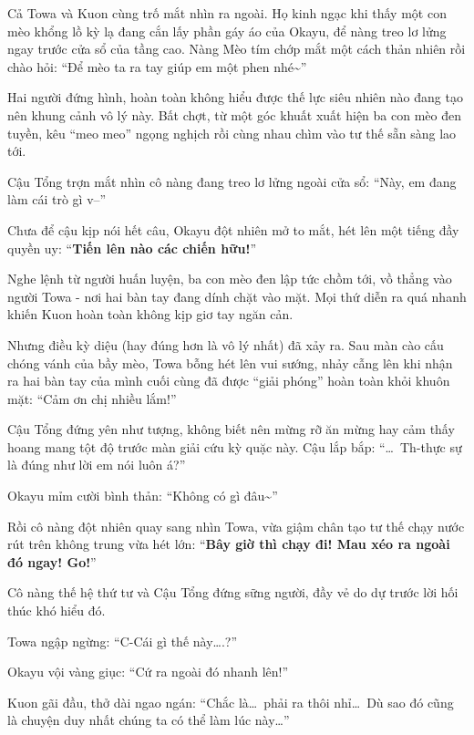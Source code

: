 \documentclass[../main.tex]{subfiles}
\begin{document}
Cả Towa và Kuon cùng trố mắt nhìn ra ngoài. Họ kinh ngạc khi thấy một con mèo khổng lồ kỳ lạ đang cắn lấy phần gáy áo của Okayu, để nàng treo lơ lửng ngay trước cửa sổ của tầng cao. Nàng Mèo tím chớp mắt một cách thản nhiên rồi chào hỏi: ``Để mèo ta ra tay giúp em một phen nhé\~{}''


Hai người đứng hình, hoàn toàn không hiểu được thế lực siêu nhiên nào đang tạo nên khung cảnh vô lý này. Bất chợt, từ một góc khuất xuất hiện ba con mèo đen tuyền, kêu ``meo meo'' ngọng nghịch rồi cùng nhau chìm vào tư thế sẵn sàng lao tới.

Cậu Tổng trợn mắt nhìn cô nàng đang treo lơ lửng ngoài cửa sổ: ``Này, em đang làm cái trò gì v--''

Chưa để cậu kịp nói hết câu, Okayu đột nhiên mở to mắt, hét lên một tiếng đầy quyền uy: ``\textbf{Tiến lên nào các chiến hữu!}''

Nghe lệnh từ người huấn luyện, ba con mèo đen lập tức chồm tới, vồ thẳng vào người Towa - nơi hai bàn tay đang dính chặt vào mặt. Mọi thứ diễn ra quá nhanh khiến Kuon hoàn toàn không kịp giơ tay ngăn cản.

Nhưng điều kỳ diệu (hay đúng hơn là vô lý nhất) đã xảy ra. Sau màn cào cấu chóng vánh của bầy mèo, Towa bỗng hét lên vui sướng, nhảy cẫng lên khi nhận ra hai bàn tay của mình cuối cùng đã được ``giải phóng'' hoàn toàn khỏi khuôn mặt: ``Cảm ơn chị nhiều lắm!''


Cậu Tổng đứng yên như tượng, không biết nên mừng rỡ ăn mừng hay cảm thấy hoang mang tột độ trước màn giải cứu kỳ quặc này. Cậu lắp bắp: ``\dots\ Th-thực sự là đúng như lời em nói luôn á?''

Okayu mỉm cười bình thản: ``Không có gì đâu\~{}''

Rồi cô nàng đột nhiên quay sang nhìn Towa, vừa giậm chân tạo tư thế chạy nước rút trên không trung vừa hét lớn: ``\textbf{Bây giờ thì chạy đi! Mau xéo ra ngoài đó ngay! Go!}''

Cô nàng thế hệ thứ tư và Cậu Tổng đứng sững người, đầy vẻ do dự trước lời hối thúc khó hiểu đó.

Towa ngập ngừng: ``C-Cái gì thế này\dots.?''

Okayu vội vàng giục: ``Cứ ra ngoài đó nhanh lên!''

Kuon gãi đầu, thở dài ngao ngán: ``Chắc là\dots\ phải ra thôi nhỉ\dots\ Dù sao đó cũng là chuyện duy nhất chúng ta có thể làm lúc này\dots''
\end{document}
